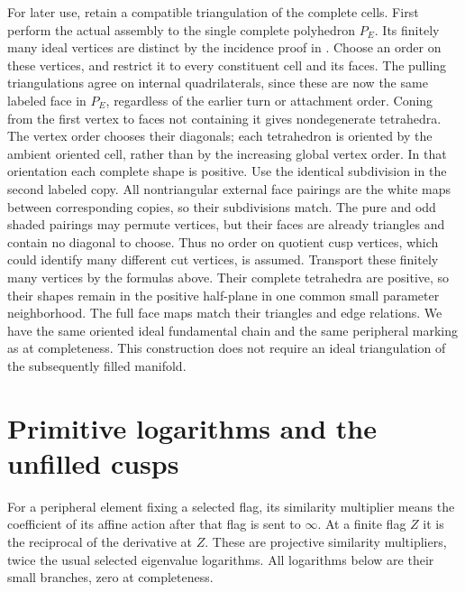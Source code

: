 For later use, retain a compatible triangulation of the complete
cells. First perform the actual assembly to the single complete
polyhedron $P_E$. Its finitely many ideal vertices are distinct
by the incidence proof in \cite[Section~3]{Geometry}.
Choose an order on these vertices, and restrict it to every
constituent cell and its faces. The pulling triangulations agree
on internal quadrilaterals, since these are now the same labeled
face in $P_E$, regardless of the earlier turn or attachment order.
Coning from the first vertex to faces not containing it gives
nondegenerate tetrahedra. The vertex order chooses their diagonals;
each tetrahedron is oriented by the ambient oriented cell, rather
than by the increasing global vertex order. In that orientation
each complete shape is positive.
Use the identical subdivision in the second labeled copy.
All nontriangular external face pairings are the white maps
between corresponding copies, so their subdivisions match.
The pure and odd shaded pairings may permute vertices, but their
faces are already triangles and contain no diagonal to choose.
Thus no order on quotient cusp vertices, which could identify
many different cut vertices, is assumed.
Transport these finitely many vertices by the formulas above.
Their complete tetrahedra are positive, so their shapes remain
in the positive half-plane in one common small parameter
neighborhood. The full face maps match their triangles and
edge relations. We have the same oriented ideal fundamental
chain and the same peripheral marking as at completeness.
This construction does not require an ideal triangulation of
the subsequently filled manifold.

\section{Primitive logarithms and the unfilled cusps}
\label{cf:peripheral}

For a peripheral element fixing a selected flag, its similarity
multiplier means the coefficient of its affine action after
that flag is sent to $\infty$. At a finite flag $Z$ it is the
reciprocal of the derivative at $Z$. These are projective
similarity multipliers, twice the usual selected eigenvalue
logarithms. All logarithms below are their small branches,
zero at completeness.

